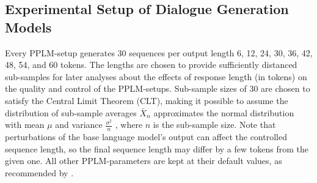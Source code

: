 
\subsection{Experimental Setup of Dialogue Generation Models}
\label{subsec:experimental_details_generation}



Every PPLM-setup generates 30 sequences per output length 6, 12, 24, 30, 36, 42, 48, 54, and 60 tokens. 
The lengths are chosen to provide sufficiently distanced sub-samples for later analyses about the effects of response length (in tokens) on the quality and control of the PPLM-setups.
Sub-sample sizes of 30 are chosen to satisfy the Central Limit Theorem (CLT), making it possible to assume the distribution of sub-sample averages $\bar{X}_n$ approximates the normal distribution with mean $\mu$ and variance $\frac{\sigma^2}{n}$ \citep{CLT2008springer}, where $n$ is the sub-sample size.
Note that perturbations of the base language model's output can affect the controlled sequence length, so the final sequence length may differ by a few tokens from the given one. All other PPLM-parameters are kept at their default values, as recommended by \cite{dathathri2019plug}. 

